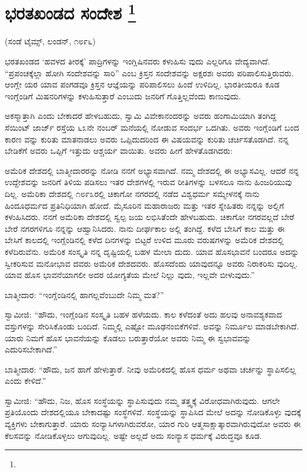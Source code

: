 
\chapter[ಭರತಖಂಡದ ಸಂದೇಶ ]{ಭರತಖಂಡದ ಸಂದೇಶ \protect\footnote{}}

\centerline{(ಸಂಡೆ ಟೈಮ್ಸ್, ಲಂಡನ್​, ೧೮೯೬)}

ಭರತಖಂಡದ ‘ಹವಳದ ತೀರಕ್ಕೆ’ ಪಾದ್ರಿಗಳನ್ನು ಇಂಗ್ಲಿಷಿನವರು ಕಳುಹಿಸು ವುದು ಎಲ್ಲರಿಗೂ ವೇದ್ಯವಾಗಿದೆ. “ಪ್ರಪಂಚಕ್ಕೆಲ್ಲಾ ಹೋಗಿ ಸಂದೇಶವನ್ನು ಸಾರಿ” ಎಂಬ ಕ್ರಿಸ್ತನ ಸಂದೇಶವನ್ನು ಅಕ್ಷರಶಃ ಅವರು ಪರಿಪಾಲಿಸುತ್ತಿರುವರು. ಆಂಗ್ಲೇ ಯರ ಯಾವ ಪಂಗಡವೂ ಕ್ರಿಸ್ತನ ಆಜ್ಞೆಯನ್ನು ಪರಿಪಾಲಿಸಲು ಹಿಂದೆ ಉಳಿದಿಲ್ಲ. ಭಾರತೀಯರೂ ಕೂಡ ಇಂಗ್ಲೆಂಡಿಗೆ ಮಿಷನರಿಗಳನ್ನು ಕಳುಹಿಸುತ್ತಾರೆ ಎಂಬುದು ಜನರಿಗೆ ಗೊತ್ತಿಲ್ಲವೆಂದು ಕಾಣುವುದು.

ಅಕಸ್ಮಾತ್ತಾಗಿ ಎಂದು ಬೇಕಾದರೆ ಹೇಳಬಹುದು, ಸ್ವಾಮಿ ವಿವೇಕಾನಂದರನ್ನು ಅವರು ಹಂಗಾಮಿಯಾಗಿ ತಂಗಿದ್ದ ಸೆಯಿಂಟ್​ ಜಾರ್ಜ್​ ರಸ್ತೆಯ ೬೩ನೇ ನಂಬರ್​ ಮನೆಯಲ್ಲಿ ನೋಡುವ ಸಂದರ್ಭ ಒದಗಿತು. ಅವರು ಇಂಗ್ಲೆಂಡಿಗೆ ಬಂದ ಕಾರಣ ವನ್ನು ಕುರಿತು ಮಾತನಾಡಲು ಅವರು ಒಪ್ಪಿದುದರಿಂದ ಈ ವಿಷಯವನ್ನು ಕುರಿತು ಚರ್ಚಿಸತೊಡಗಿದೆ. ನನ್ನ ಬೇಡಿಕೆಗೆ ಅವರು ಒಪ್ಪಿಗೆ ಇತ್ತುದು ಆಶ್ಚರ್ಯ ವಾಯಿತು. ಅವರು ಹೀಗೆ ಹೇಳತೊಡಗಿದರು:

ಅಮೆರಿಕ ದೇಶದಲ್ಲಿ ಬಾತ್ಮೀದಾರರನ್ನು ನೋಡಿ ನನಗೆ ಅಭ್ಯಾಸವಾಗಿದೆ. ನಮ್ಮ ದೇಶದಲ್ಲಿ ಈ ಅಭ್ಯಾಸವಿಲ್ಲ. ಆದರೆ ನನ್ನ ಉದ್ದೇಶವನ್ನು ಜನರಿಗೆ ತಿಳಿಯ ಪಡಿಸಲು ಇತರ ದೇಶಗಳಲ್ಲಿ ಇರುವ ರೀತಿಗಳನ್ನು ಬಳಸಲೂ ನಾನು ಹಿಂಜರಿಯುವು ದಿಲ್ಲ. ಅಮೆರಿಕಾ ದೇಶದಲ್ಲಿ ೧೮೯೩ರಲ್ಲಿ ಚಿಕಾಗೋ ನಗರದಲ್ಲಿ ನಡೆದ ವಿಶ್ವಧರ್ಮ ಸಮ್ಮೇಳನಕ್ಕೆ ನಾನು ಹಿಂದೂಧರ್ಮದ ಪ್ರತಿನಿಧಿಯಾಗಿ ಹೋದೆ. ಮೈಸೂರಿನ ಮಹಾರಾಜರು ಮತ್ತು ಇತರ ಸ್ನೇಹಿತರು ನನ್ನನ್ನು ಅಲ್ಲಿಗೆ ಕಳುಹಿಸಿದರು. ನನಗೆ ಅಮೆರಿಕಾ ದೇಶದಲ್ಲಿ ಸ್ವಲ್ಪ ಜಯ ಲಭಿಸಿತೆಂದೇ ಹೇಳಬಹುದು. ಚಿಕಾಗೋ ನಗರವಲ್ಲದೆ ಬೇರೆ ಬೇರೆ ನಗರಗಳಿಗೂ ನನ್ನನ್ನು ಆಹ್ವಾನಿಸಿದರು. ನಾನು ದೀರ್ಘಕಾಲ ಅಲ್ಲಿ ತಂಗಿದ್ದೆ. ಕಳೆದ ಬೇಸಿಗೆ ಕಾಲ ಮತ್ತು ಈ ಬೇಸಿಗೆ ಕಾಲದಲ್ಲಿ ಇಂಗ್ಲೆಂಡಿನಲ್ಲಿ ಕಳೆದ ದಿನಗಳನ್ನು ಬಿಟ್ಟರೆ ಉಳಿದ ಮೂರು ವರುಷಗಳನ್ನು ಅಮೆರಿಕ ದೇಶದಲ್ಲಿ ಕಳೆದಿರುವೆನು. ಅಮೆರಿಕ ಸಂಸ್ಕೃತಿ ನನ್ನ ದೃಷ್ಟಿಯಲ್ಲಿ ಬಹಳ ಮೇಲಾ ದುದು. ಯಾವ ಹೊಸಭಾವನೆ ಬಂದರೂ ಅದನ್ನು ಸ್ವೀಕರಿಸುವ ಮನೋಭಾವ ದವರು ಅಮೆರಿಕ ದೇಶದವರು. ಹೊಸದೆಂದು ಯಾವುದನ್ನೂ ಅವರು ನಿರಾಕರಿಸು ವುದಿಲ್ಲ. ಯಾವ ಹೊಸ ಭಾವನೆಯಾಗಲೀ ಅದರ ಯೋಗ್ಯತೆಯ ಮೇಲೆ ನಿಲ್ಲು ವುದು, ಇಲ್ಲವೇ ಬೀಳುವುದು.”

ಬಾತ್ಮೀದಾರ: “ಇಂಗ್ಲೆಂಡಿನಲ್ಲಿ ಹಾಗಲ್ಲವೆಂಬುದೇ ನಿಮ್ಮ ಮತ?”

ಸ್ವಾಮೀಜಿ: “ಹೌದು, ಇಂಗ್ಲೆಂಡಿನ ಸಂಸ್ಕೃತಿ ಬಹಳ ಹಳೆಯದು. ಕಾಲ ಕಳೆದಂತೆ ಅದು ಹಲವು ಅನಾವಶ್ಯಕವಾದ ವಸ್ತುಗಳನ್ನು ಸೇರಿಸಿಕೊಂಡು ಬಂದಿದೆ. ನಿಮ್ಮಲ್ಲಿ ಎಷ್ಟೋ ಮೂಢನಂಬಿಕೆಗಳಿವೆ. ಅವನ್ನು ನಿರ್ಮೂಲ ಮಾಡಬೇಕಾಗಿದೆ. ಯಾರು ನಿಮಗೆ ಹೊಸ ಭಾವನೆಯನ್ನು ಕೊಡಲು ಬರುತ್ತಾರೆಯೋ ಅವರು ನಿಮ್ಮ ಈ ಸ್ವಭಾವವನ್ನು ಎದುರಿಸಬೇಕಾಗಿದೆ.”

ಬಾತ್ಮೀದಾರ: “ಹೌದು, ಜನ ಹಾಗೆ ಹೇಳುತ್ತಾರೆ. ನೀವು ಅಮೆರಿಕದಲ್ಲಿ ಹೊಸ ಧರ್ಮ ಅಥವಾ ಚರ್ಚನ್ನು ಸ್ಥಾಪಿಸಲಿಲ್ಲ ಎಂದು ಕೇಳಿದೆ.”

ಸ್ವಾಮೀಜಿ: “ಹೌದು, ನಿಜ, ಹೊಸ ಸಂಸ್ಥೆಯನ್ನು ಸ್ಥಾಪಿಸುವುದು ನಮ್ಮ ತತ್ತ್ವಕ್ಕೆ ವಿರೋಧವಾಗಿರುವುದು. ಆಗಲೇ ಪ್ರತಿಯೊಂದು ದೇಶದಲ್ಲಿಯೂ ಬೇಕಾದಷ್ಟು ಸಂಸ್ಥೆಗಳಿವೆ. ಸಂಸ್ಥೆಯನ್ನು ಸ್ಥಾಪಿಸಿದ ಮೇಲೆ ಅದನ್ನು ನೋಡಿಕೊಳ್ಳು ವುದಕ್ಕೆ ವ್ಯಕ್ತಿಗಳು ಬೇಕಾಗುತ್ತಾರೆ. ಯಾರು ಸಂನ್ಯಾಸಿಗಳಾಗಿರುವರೋ, ಯಾರ ಗುರಿ ಆತ್ಮಸಾಕ್ಷಾತ್ಕಾರವಾಗಿರುವುದೋ ಅವರು ಈ ಕೆಲಸವನ್ನು ನೋಡಿಕೊಳ್ಳಲು ಆಗುವುದಿಲ್ಲ. ಅಷ್ಟೇ ಅಲ್ಲದೆ ಅದು ಸಂನ್ಯಾಸ ಧರ್ಮಕ್ಕೆ ವಿರುದ್ಧವೂ ಕೂಡ.

